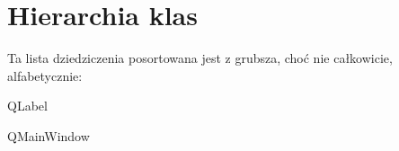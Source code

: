 \section{Hierarchia klas}
Ta lista dziedziczenia posortowana jest z grubsza, choć nie całkowicie, alfabetycznie\+:\begin{DoxyCompactList}
\item Q\+Label\begin{DoxyCompactList}
\item {}
\end{DoxyCompactList}
\item Q\+Main\+Window\begin{DoxyCompactList}
\item {}
\end{DoxyCompactList}
\item {}
\end{DoxyCompactList}
